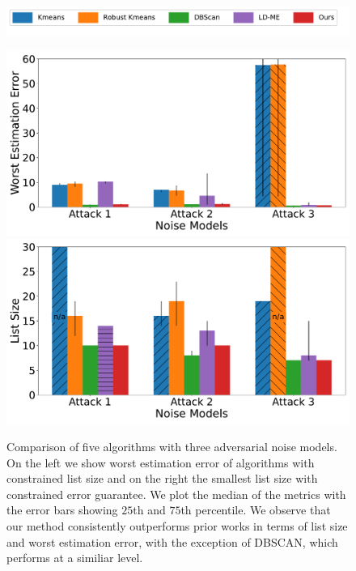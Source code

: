 \begin{figure}[t]
    \centering
    \begin{minipage}[t]{0.8\linewidth}
        \includegraphics[width=0.99\linewidth]{chapters/robust/figures/new_legend.pdf}
        \end{minipage}
    \begin{minipage}[t]{\linewidth}
        \includegraphics[width=0.49\linewidth]{chapters/robust/figures/gauss_inliers_3_attacks_error.pdf}
        \includegraphics[width=0.49\linewidth]{chapters/robust/figures/gauss_inliers_3_attacks_size.pdf}
    \end{minipage}
    \caption{Comparison of five algorithms with three adversarial noise models. On the left we show worst estimation error of algorithms with constrained list size and on the right the smallest list size with constrained error guarantee.
    We plot the median of the metrics with the error bars showing \(25\)th and \(75\)th percentile. We observe that our method consistently outperforms prior works in terms of list size and worst estimation error, with the exception of DBSCAN, which performs at a similiar level.}
    \label{fig:err}
\end{figure}

